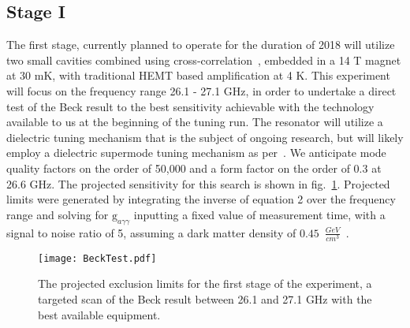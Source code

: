 \documentclass[preprint]{elsarticle}
\begin{document}
\subsection*{Stage I}
The first stage, currently planned to operate for the duration of 2018 will utilize two small cavities combined using cross-correlation~\cite{XSWisp}, embedded in a 14 T magnet at 30 mK, with traditional HEMT based amplification at 4 K. This experiment will focus on the frequency range 26.1 - 27.1 GHz, in order to undertake a direct test of the Beck result to the best sensitivity achievable with the technology available to us at the beginning of the tuning run. The resonator will utilize a dielectric tuning mechanism that is the subject of ongoing research, but will likely employ a dielectric supermode tuning mechanism as per~\cite{DielectricSupermode}. We anticipate mode quality factors on the order of 50,000 and a form factor on the order of 0.3 at 26.6 GHz. The projected sensitivity for this search is shown in fig.~\ref{fig:BeckTest}. Projected limits were generated by integrating the inverse of equation 2 over the frequency range and solving for $\text{g}_{a\gamma\gamma}$ inputting a fixed value of measurement time, with a signal to noise ratio of 5, assuming a dark matter density of $0.45$~$\frac{GeV}{cm^3}$~\cite{cdmdensity2014}.
\begin{figure}[t]
	\centering
	\texttt{[image: BeckTest.pdf]}
	\caption{The projected exclusion limits for the first stage of the experiment, a targeted scan of the Beck result between 26.1 and 27.1 GHz with the best available equipment.}
	\label{fig:BeckTest}
\end{figure}
\end{document}
